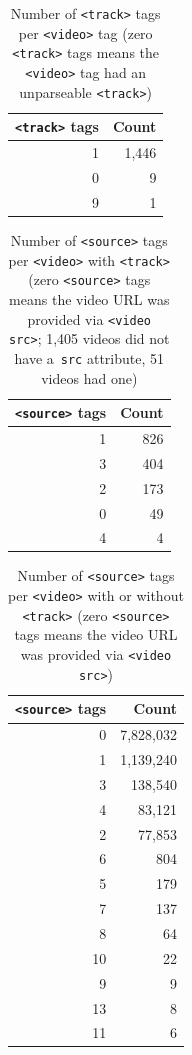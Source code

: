 \documentclass{sig-alternate}
\begin{document}
\begin{table}[b!]
  \raggedleft
  \footnotesize  
  \begin{tabular}{ r | r }                       
    \texttt{<track>} tags & Count \\
    \hline
    1 & 1,446\\
    0 & 9\\
    9 & 1\\
  \end{tabular}
  \caption{Number of \texttt{<track>} tags per
    \texttt{<video>} tag \tiny (zero \texttt{<track>}
    tags means  the \texttt{<video>} tag had
    an  unparseable \texttt{<track>})}
  \label{table:track}    
\end{table}

\begin{table}[t!]
  \raggedleft
  \footnotesize  
  \begin{tabular}{ r | r }
    \texttt{<source>} tags & Count \\
    \hline
    1 & 826\\    
    3 & 404\\    
    2 & 173\\    
    0 & 49\\
    4 & 4\\
  \end{tabular}
  \caption{Number of \texttt{<source>} tags per
    \texttt{<video>} with \texttt{<track>} \tiny (zero \texttt{<source>}
    tags means the video URL was provided via
    \texttt{<video src>}; 1,405 videos did not have
    a~\texttt{src} attribute, 51 videos had one)}
  \label{table:source}    
\end{table}

\begin{table}[t!]
  \raggedleft
  \footnotesize  
  \begin{tabular}{ r | r }
    \texttt{<source>} tags & Count \\
    \hline
    0 & 7,828,032\\
    1 & 1,139,240\\
    3 & 138,540\\
    4 & 83,121\\    
    2 & 77,853\\
    6 & 804\\    
    5 & 179\\
    7 & 137\\
    8 & 64\\
    10 & 22\\    
    9 & 9\\
    13 & 8\\
    11 & 6\\
  \end{tabular}
  \caption{Number of \texttt{<source>} tags per
    \texttt{<video>} with or without \texttt{<track>}
    \tiny (zero \texttt{<source>}
    tags means the video URL was provided via
    \texttt{<video src>})}
  \label{table:sourceFull}    
\end{table}
\end{document}
